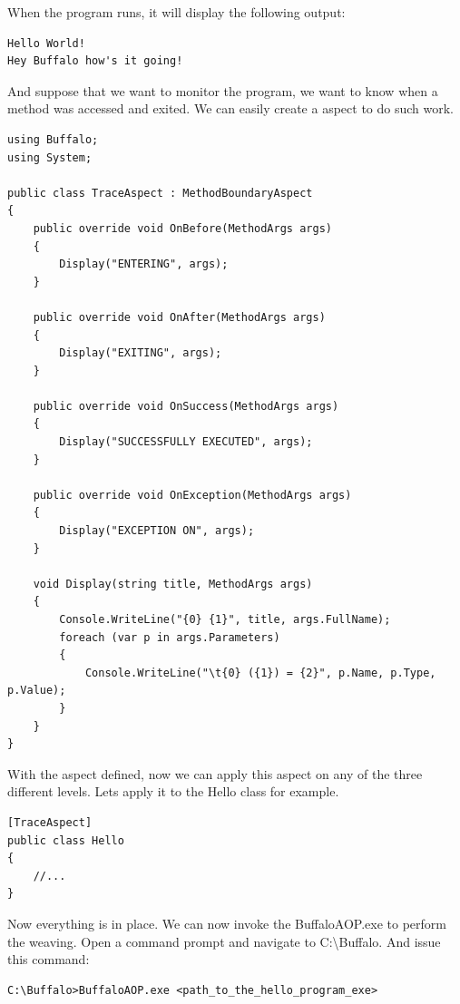 When the program runs, it will display the following output:
\begin{lstlisting}[caption={Hello program output}, label=helloout, frame=tb, basicstyle=\scriptsize]
Hello World!
Hey Buffalo how's it going!
\end{lstlisting}

And suppose that we want to monitor the program, we want to know when a method was accessed and exited. We can easily create a aspect to do such work.

\begin{lstlisting}[caption={TraceAspect}, label=traceaspect, frame=tb, basicstyle=\scriptsize]
using Buffalo;
using System;

public class TraceAspect : MethodBoundaryAspect
{
    public override void OnBefore(MethodArgs args)
    {
        Display("ENTERING", args);
    }

    public override void OnAfter(MethodArgs args)
    {
        Display("EXITING", args);
    }

    public override void OnSuccess(MethodArgs args)
    {
        Display("SUCCESSFULLY EXECUTED", args);
    }

    public override void OnException(MethodArgs args)
    {
        Display("EXCEPTION ON", args);
    }

    void Display(string title, MethodArgs args)
    {
        Console.WriteLine("{0} {1}", title, args.FullName);
        foreach (var p in args.Parameters)
        {
            Console.WriteLine("\t{0} ({1}) = {2}", p.Name, p.Type, p.Value);
        }
    }
}
\end{lstlisting}

With the aspect defined, now we can apply this aspect on any of the three different levels. Lets apply it to the Hello class for example.
\begin{lstlisting}[caption={Apply Aspect to the Hello Class}, label=helloaspect, frame=tb, basicstyle=\scriptsize]
[TraceAspect]
public class Hello
{
	//...
}
\end{lstlisting}

Now everything is in place. We can now invoke the BuffaloAOP.exe to perform the weaving. Open a command prompt and navigate to C:\textbackslash{Buffalo}. And issue this command:

\begin{lstlisting}[caption={Invoking BuffaloAOP.exe}, label=buffalocmd, frame=tb, basicstyle=\scriptsize]
C:\Buffalo>BuffaloAOP.exe <path_to_the_hello_program_exe>
\end{lstlisting}

